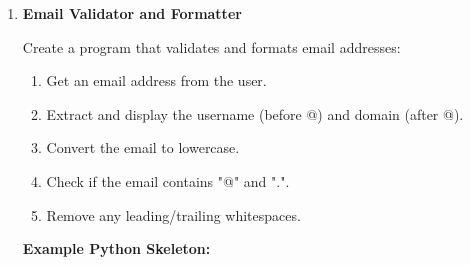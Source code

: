 \documentclass[a4paper,11pt]{article}
\theoremstyle{mytheor}
\begin{document}
\begin{enumerate}
    \textbf{Example Python Skeleton:}






    \item \textbf{Email Validator and Formatter}
    
    Create a program that validates and formats email addresses:
    \begin{enumerate} 
        \item Get an email address from the user.
        \item Extract and display the username (before @) and domain (after @).
        \item Convert the email to lowercase.
        \item Check if the email contains "@" and ".".
        \item Remove any leading/trailing whitespaces.
    \end{enumerate}
    
    \textbf{Example Python Skeleton:}




    


\end{enumerate}
\end{document}
